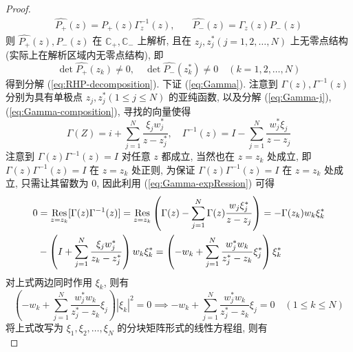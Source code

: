 \begin{proof}
\begin{equation}
\begin{aligned}
      \hat{P_{+}}(z) = P_{+}(z) \Gamma_{z}^{-1}(z),& \quad \hat{P_{-}}(z) = \Gamma_{z}(z) P_{-}(z)
    \end{aligned}
  \end{equation}
  则 $ \hat{P_{+}}(z), \hat{P_{-}}(z) $ 在 $ \mathbb{C_{+}}, \mathbb{C_{-}} $ 上解析, 且在 $ z_{j}, z_{j}^{*} (j = 1,2, \dots, N) $ 上无零点结构 (实际上在解析区域内无零点结构), 即
  \begin{equation}
    \det \hat{P_{+}}(z_{k}) \neq 0, \quad \det \hat{P_{-}}(z_{k}^{*}) \neq 0 \quad (k = 1,2, \dots, N) 
  \end{equation}
  得到分解 (\ref{eq:RHP-decomposition}). 下证 (\ref{eq:Gamma}). 注意到 $ \Gamma(z), \Gamma^{-1}(z) $ 分别为具有单极点 $ z_{j}, z_{j}^{*} (1 \leq j \leq N)$ 的亚纯函数, 以及分解 (\ref{eq:Gamma-j}), (\ref{eq:Gamma-composition}), 寻找的向量使得
  \begin{equation}
    \Gamma(Z) = i + \sum_{j=1}^{N} \frac{\xi_{j}w_{j}^{*}}{z-z_{j}^{*}}, \quad \Gamma^{-1}(z) = I - \sum_{j=1}^{N} \frac{w_{j}^{*}\xi_{j}}{z - z_{j}} \label{eq:Gamma-expRession}
  \end{equation} 
  注意到 $ \Gamma(z) \Gamma^{-1}(z) = I $ 对任意 $ z $ 都成立, 当然也在 $ z = z_{k} $ 处成立, 即 $ \Gamma(z) \Gamma^{-1}(z) = I $ 在 $ z = z_{k} $ 处正则, 为保证 $ \Gamma(z) \Gamma^{-1}(z) = I $ 在 $ z = z_{k} $ 处成立, 只需让其留数为 $ 0 $, 因此利用 (\ref{eq:Gamma-expRession}) 可得
  \begin{equation}
    \begin{aligned}
      0 &= \operatorname*{Res}_{z = z_{k}} [\Gamma(z)\Gamma^{-1}(z)] = \operatorname*{Res}_{z = z_{k}} \left( \Gamma(z) - \sum_{j = 1}^{N} \Gamma(z)\frac{w_{j}\xi_{j}^{*}}{z- z_{j}} \right) = - \Gamma(z_{k}) w_{k} \xi_{k}^{*} \\
      & - \left( I + \sum_{j = 1}^{N} \frac{\xi_{j}w_{j}^{*}}{z_{k} - z_{j}^{*}} \right) w_{k} \xi_{k}^{*} = \left( - w_{k} + \sum_{j = 1}^{N} \frac{w_{j}^{*}w_{k}}{z_{j}^{*} - z_{k}} \xi_{j}^{*} \right) \xi_{k}^{*}
    \end{aligned}
  \end{equation}
  对上式两边同时作用 $ \xi_{k} $, 则有 
  \begin{equation}
    \left( - w_{k} + \sum_{j = 1}^{N} \frac{w_{j}^{*}w_{k}}{z_{j}^{*} - z_{k}} \xi_{j} \right) | \xi_{k} |^{2} = 0 \implies  - w_{k} + \sum_{j = 1}^{N} \frac{w_{j}^{*}w_{k}}{z_{j}^{*} - z_{k}} \xi_{j} = 0 \quad (1 \leq k \leq N)
  \end{equation}
  将上式改写为 $ \xi_{1}, \xi_{2}, \dots, \xi_{N} $ 的分块矩阵形式的线性方程组, 则有
  \begin{equation}

\end{equation}
\end{proof}
